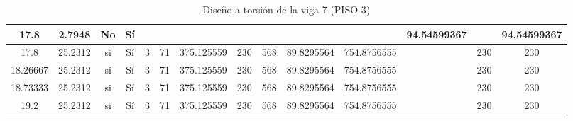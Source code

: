 \begin{table}[H]
{\begin{tabular}{|c|c|c|c|c|c|c|c|c|c|c|c|c|c|}
\hline
17.8 & 2.7948 & No  & Sí  &     &     &     &     &     &     &     & 94.54599367 &     & 94.54599367 \bigstrut\\
\hline
17.8 & 25.2312 & si  & Sí  & 3   & 71  & 375.125559 & 230 & 568 & 89.8295564 & 754.8756555 &     & 230 & 230 \bigstrut\\
\hline
18.26667 & 25.2312 & si  & Sí  & 3   & 71  & 375.125559 & 230 & 568 & 89.8295564 & 754.8756555 &     & 230 & 230 \bigstrut\\
\hline
18.73333 & 25.2312 & si  & Sí  & 3   & 71  & 375.125559 & 230 & 568 & 89.8295564 & 754.8756555 &     & 230 & 230 \bigstrut\\
\hline
19.2 & 25.2312 & si  & Sí  & 3   & 71  & 375.125559 & 230 & 568 & 89.8295564 & 754.8756555 &     & 230 & 230 \bigstrut\\
\hline
\end{tabular}%


  }
      \caption{Diseño a torsión de la viga 7 (PISO 3) }
  \label{tab:T VG7 P3 }%
\end{table}%
